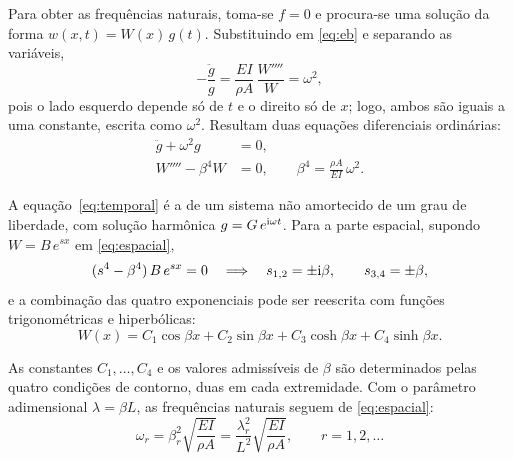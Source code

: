 Para obter as frequências naturais, toma-se $f = 0$ e procura-se uma solução da forma
$w(x,t) = W(x)\,g(t)$. Substituindo em \eqref{eq:eb} e separando as variáveis,
\begin{equation*}
    -\frac{\ddot g}{g} = \frac{EI}{\rho A}\,\frac{W''''}{W} = \omega^2,
\end{equation*}
pois o lado esquerdo depende só de $t$ e o direito só de $x$; logo, ambos são iguais
a uma constante, escrita como $\omega^2$. Resultam duas equações diferenciais
ordinárias:
\begin{subequations}
    \label{eq:separadas}
    \begin{align}
        \ddot g + \omega^2 g & = 0, \label{eq:temporal}                           \\
        W'''' - \beta^4 W    & = 0, \qquad \beta^4 = \frac{\rho A}{EI}\,\omega^2.
        \label{eq:espacial}
    \end{align}
\end{subequations}

A equação~\eqref{eq:temporal} é a de um sistema não amortecido de um grau de
liberdade, com solução harmônica $g = G\,e^{\mathrm{i}\omega t}$. Para a parte espacial,
supondo $W = B\,e^{sx}$ em \eqref{eq:espacial},
\begin{equation*}
    (s^4 - \beta^4)\,B\,e^{sx} = 0 \quad\Longrightarrow\quad
    s_{1,2} = \pm\mathrm{i}\beta, \qquad s_{3,4} = \pm\beta,
\end{equation*}
e a combinação das quatro exponenciais pode ser reescrita com funções trigonométricas
e hiperbólicas:
\begin{equation}
    W(x) = C_1\cos\beta x + C_2\sin\beta x + C_3\cosh\beta x + C_4\sinh\beta x.
    \label{eq:Wgeral}
\end{equation}

As constantes $C_1,\dots,C_4$ e os valores admissíveis de $\beta$ são determinados
pelas quatro condições de contorno, duas em cada extremidade. Com o parâmetro
adimensional $\lambda = \beta L$, as frequências naturais seguem de
\eqref{eq:espacial}:
\begin{equation}
    \omega_r = \beta_r^2\sqrt{\frac{EI}{\rho A}}
    = \frac{\lambda_r^2}{L^2}\sqrt{\frac{EI}{\rho A}},
    \qquad r = 1, 2, \dots
    \label{eq:omega}
\end{equation}



